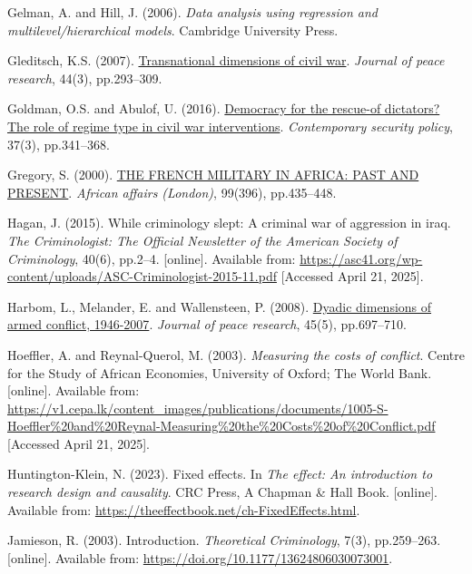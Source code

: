\documentclass[
]{article}
\newlength{\cslhangindent}
\newenvironment{CSLReferences}[2] %
 {\begin{list}{}{%
  \setlength{\itemindent}{0pt}
  \setlength{\leftmargin}{0pt}
  \setlength{\parsep}{0pt}
  \ifodd #1
   \setlength{\leftmargin}{\cslhangindent}
   \setlength{\itemindent}{-1\cslhangindent}
  \fi
  \setlength{\itemsep}{#2\baselineskip}}}
 {\end{list}}
\begin{document}
\begin{CSLReferences}{0}{1}
Gelman, A. and Hill, J. (2006). \emph{Data analysis using regression and
multilevel/hierarchical models}. Cambridge University Press.

Gleditsch, K.S. (2007).
\href{https://doi.org/10.1177/0022343307076637}{Transnational dimensions
of civil war}. \emph{Journal of peace research}, 44(3), pp.293--309.

Goldman, O.S. and Abulof, U. (2016).
\href{https://doi.org/10.1080/13523260.2016.1228033}{Democracy for the
rescue-of dictators? The role of regime type in civil war
interventions}. \emph{Contemporary security policy}, 37(3), pp.341--368.

Gregory, S. (2000). \href{https://doi.org/10.1093/afraf/99.396.435}{THE
FRENCH MILITARY IN AFRICA: PAST AND PRESENT}. \emph{African affairs
(London)}, 99(396), pp.435--448.

Hagan, J. (2015). While criminology slept: A criminal war of aggression
in iraq. \emph{The Criminologist: The Official Newsletter of the
American Society of Criminology}, 40(6), pp.2--4. {[}online{]}.
Available from:
\url{https://asc41.org/wp-content/uploads/ASC-Criminologist-2015-11.pdf}
{[}Accessed April 21, 2025{]}.

Harbom, L., Melander, E. and Wallensteen, P. (2008).
\href{https://doi.org/10.1177/0022343308094331}{Dyadic dimensions of
armed conflict, 1946-2007}. \emph{Journal of peace research}, 45(5),
pp.697--710.

Hoeffler, A. and Reynal-Querol, M. (2003). \emph{Measuring the costs of
conflict}. Centre for the Study of African Economies, University of
Oxford; The World Bank. {[}online{]}. Available from:
\url{https://v1.cepa.lk/content_images/publications/documents/1005-S-Hoeffler\%20and\%20Reynal-Measuring\%20the\%20Costs\%20of\%20Conflict.pdf}
{[}Accessed April 21, 2025{]}.

Huntington-Klein, N. (2023). Fixed effects. In \emph{The effect: An
introduction to research design and causality}. CRC Press, A Chapman \&
Hall Book. {[}online{]}. Available from:
\url{https://theeffectbook.net/ch-FixedEffects.html}.

Jamieson, R. (2003). Introduction. \emph{Theoretical Criminology}, 7(3),
pp.259--263. {[}online{]}. Available from:
\url{https://doi.org/10.1177/13624806030073001}.


\end{CSLReferences}
\end{document}
